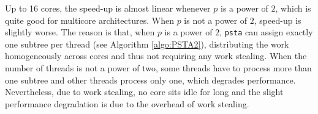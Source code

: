 %
%        
%
Up to 16 cores, the speed-up is almost linear whenever $p$ is a power
of $2$, which is quite good for multicore
architectures. When $p$ is not a power of $2$, speed-up is slightly
worse. The reason is that, when $p$ is a power of $2$, {\tt psta} can
assign exactly one subtree per thread (see Algorithm
\ref{algo:PSTA2}), distributing the work homogeneously across cores
and thus not requiring any work stealing.  When the number of threads
is not a power of two, some threads have to process more than one
subtree and other threads process only one, which degrades
performance.  Nevertheless, due to work stealing, no core sits idle
for long and the slight performance degradation is due to the overhead
of work stealing.

